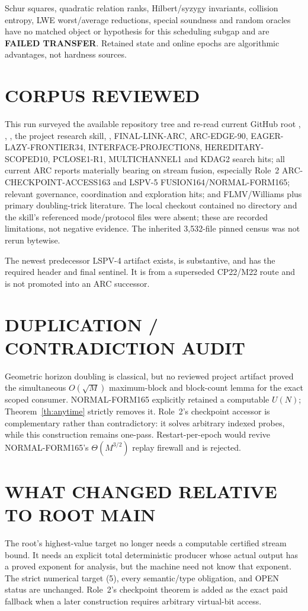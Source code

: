 \documentclass[11pt]{article}
\begin{document}
Schur squares, quadratic relation ranks, Hilbert/syzygy invariants, collision
entropy, LWE worst/average reductions, special soundness and random oracles have
no matched object or hypothesis for this scheduling subgap and are
\textbf{FAILED TRANSFER}.  Retained state and online epochs are algorithmic
advantages, not hardness sources.

\section{CORPUS REVIEWED}
This run surveyed the available repository tree and re-read current GitHub root
, , , the project research skill,
, FINAL-LINK-ARC, ARC-EDGE-90, EAGER-LAZY-FRONTIER34,
INTERFACE-PROJECTION8, HEREDITARY-SCOPED10, PCLOSE1-R1, MULTICHANNEL1 and KDAG2
search hits; all current ARC reports materially bearing on stream fusion,
especially Role~2 ARC-CHECKPOINT-ACCESS163 and LSPV-5 FUSION164/NORMAL-FORM165;
relevant governance, coordination and exploration hits; and FLMV/Williams plus
primary doubling-trick literature.  The local checkout contained no
 directory and the skill's referenced mode/protocol files were
absent; these are recorded limitations, not negative evidence.  The inherited
3,532-file pinned census was not rerun bytewise.

The newest predecessor LSPV-4 artifact
exists, is substantive, and has the required header and final sentinel.  It is
from a superseded CP22/M22 route and is not promoted into an ARC successor.

\section{DUPLICATION / CONTRADICTION AUDIT}
Geometric horizon doubling is classical, but no reviewed project artifact
proved the simultaneous $O(\sqrt M)$ maximum-block and block-count lemma for
the exact scoped consumer.  NORMAL-FORM165 explicitly retained a computable
$U(N)$; Theorem~\ref{th:anytime} strictly removes it.  Role~2's checkpoint
accessor is complementary rather than contradictory: it solves arbitrary
indexed probes, while this construction remains one-pass.  Restart-per-epoch
would revive NORMAL-FORM165's $\Theta(M^{3/2})$ replay firewall and is rejected.

\section{WHAT CHANGED RELATIVE TO ROOT MAIN}
The root's highest-value target no longer needs a computable certified stream
bound.  It needs an explicit total deterministic producer whose actual output
has a proved exponent for analysis, but the machine need not know that exponent.
The strict numerical target (5), every semantic/type obligation, and OPEN status
are unchanged.  Role~2's checkpoint theorem is added as the exact paid fallback
when a later construction requires arbitrary virtual-bit access.
\end{document}
